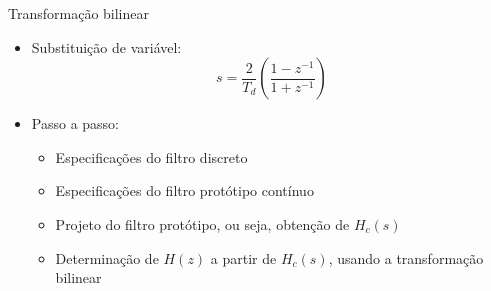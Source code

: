 
\begin{slide}{Transformação bilinear}
	\begin{itemize}
		\item Substituição de variável: \begin{equation*} s = \frac{2}{T_d}\left ( \frac{1-z^{-1}}{1+z^{-1}}\right )\end{equation*}
		\item Passo a passo:
		\begin{itemize}
			\item Especificações do filtro discreto
			\item Especificações do filtro protótipo contínuo
			\item Projeto do filtro protótipo, ou seja, obtenção de $H_c(s)$
			\item Determinação de $H(z)$ a partir de $H_c(s)$, usando a transformação bilinear
		\end{itemize}
	\end{itemize}
\end{slide}

